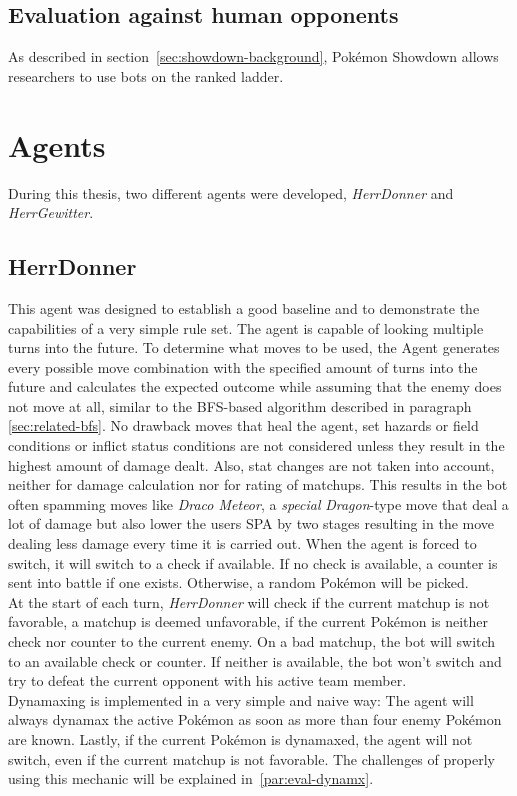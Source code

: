 \subsection{Evaluation against human opponents}
As described in section~\ref{sec:showdown-background}, Pokémon Showdown allows researchers to use bots on the
ranked ladder. 

\section{Agents}
During this thesis, two different agents were developed, \textit{HerrDonner} and \textit{HerrGewitter}.

\subsection{HerrDonner}
This agent was designed to establish a good baseline and to demonstrate the capabilities of a very
simple rule set. The agent is capable of looking multiple turns into the future. To determine
what moves to be used, the Agent generates every possible move combination with the specified amount
of turns into the future and calculates the expected outcome while assuming that the enemy does 
not move at all, similar to the \ac{BFS}-based algorithm described in paragraph \ref{sec:related-bfs}. 
No drawback moves that heal the agent, set hazards or field conditions or inflict status conditions
are not considered unless they result in the highest amount of damage dealt. Also, stat changes are 
not taken into account, neither for damage calculation nor for rating of matchups. 
This results in the bot often spamming moves like \textit{Draco Meteor}, a \textit{special} 
\textit{Dragon}-type move that deal a lot of damage but also lower the
users \ac{SPA} by two stages resulting in the move dealing less damage every time it is carried out. 
When the agent is forced to switch, it will switch to a check if available. If no check is available,
a counter is sent into battle if one exists. Otherwise, a random Pokémon will be picked. \\
At the start of each turn, \textit{HerrDonner} will check if the current matchup is not favorable, 
a matchup is deemed unfavorable, if the current Pokémon is neither check nor 
counter to the current enemy. On a bad matchup, the bot will switch to an available 
check or counter. If neither is available, the bot won't switch and try to
defeat the current opponent with his active team member. \\
Dynamaxing is implemented in a very simple and naive way: The agent will always dynamax the
active Pokémon as soon as more than four enemy Pokémon are known. Lastly, if the
current Pokémon is dynamaxed, the agent will not switch, even if the current matchup is not
favorable. The challenges of properly using this mechanic will be explained in~\ref{par:eval-dynamx}.

